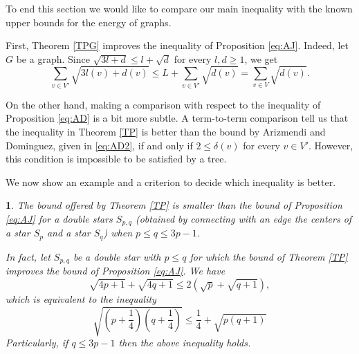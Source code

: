 \documentclass[a4paper]{article}
\theoremstyle{plain}
\newtheorem{example}{\protect\exname}
\renewcommand{\exname}{Example}
\renewcommand{\rename}{Remark}%
\renewcommand{\exname}{Ejemplo}\renewcommand{\rename}{Observaci\'on}%
\begin{document}
To end this section we would like to compare our main inequality with the known upper bounds for the energy of graphs.

First, Theorem \ref{TPG} improves the inequality of Proposition \ref{eq:AJ}. Indeed, let \(G\) be a graph. Since \(\sqrt{3l + d} \leq l + \sqrt{d}\) for every \(l,d \geq 1\), we get
    \[
        \sum_{v \in V'} \sqrt{3l(v) + d(v)} \leq L + \sum_{v \in V'} \sqrt{d(v)} = \sum_{v \in V} \sqrt{d(v)}.
    \]

On the other hand, making a comparison with respect to the inequality of Proposition \ref{eq:AD} is a bit more subtle. A term-to-term comparison tell us that the inequality in Theorem \ref{TP} is better than the bound by Arizmendi and Dominguez, given in \eqref{eq:AD2},  if and only if \(2 \leq \delta(v)\) for every \(v \in V'\). However, this condition is impossible to be satisfied by a tree.

We now show an example and a criterion to decide which inequality is better.


\begin{example}
    The bound offered by Theorem \ref{TP} is smaller than the bound of Proposition \ref{eq:AJ} for a double stars \(S_{p,q}\) (obtained by connecting with an edge the centers of a star \(S_p\) and a star \(S_q\)) when \(p \leq q \leq 3p - 1\).

    In fact, let \(S_{p,q}\) be a double star with \(p \leq q\) for which the bound of Theorem \ref{TP} improves the bound of Proposition \ref{eq:AJ}. We have
    \[
        \sqrt{4p + 1} + \sqrt{4q + 1} \leq 2\left(\sqrt{p} + \sqrt{q + 1}\right),
    \]
    which is equivalent to the inequality
    \[
        \sqrt{\left(p + \frac{1}{4}\right)\left(q + \frac{1}{4}\right)} \leq \frac{1}{4} + \sqrt{p\left(q + 1\right)}
    \]
    Particularly, if \(q \leq 3p - 1\) then the above inequality holds.
    
\end{example}
\end{document}
